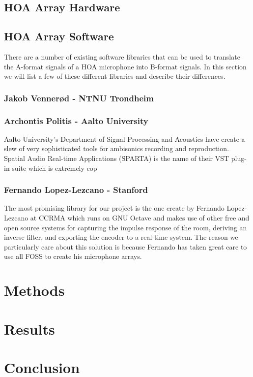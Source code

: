 \subsection{HOA Array Hardware}

\subsection{HOA Array Software}
There are a number of existing software libraries that can be used to translate the A-format signals of a HOA microphone into B-format signals. In this section we will list a few of these different libraries and describe their differences.

\subsubsection{Jakob Vennerød - NTNU Trondheim}

\subsubsection{Archontis Politis - Aalto University}
Aalto University's Department of Signal Processing and Acoustics have create a slew of very sophisticated tools for ambisonics recording and reproduction. Spatial Audio Real-time Applications (SPARTA) is the name of their VST plug-in suite which is extremely cop

\subsubsection{Fernando Lopez-Lezcano - Stanford}
The most promising library for our project is the one create by Fernando Lopez-Lezcano at CCRMA which runs on GNU Octave and makes use of other free and open source systems for capturing the impulse response of the room, deriving an inverse filter, and exporting the encoder to a real-time system. The reason we particularly care about this solution is because Fernando has taken great care to use all FOSS to create his microphone arrays. 


\section{Methods}

\section{Results}

\section{Conclusion}
